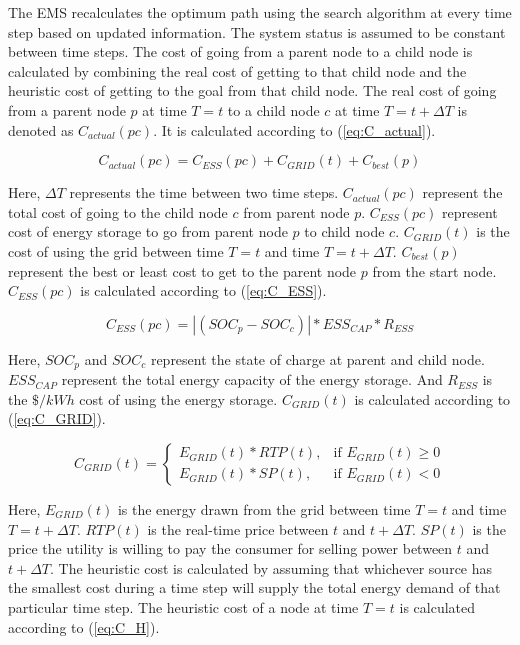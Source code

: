 The EMS recalculates the optimum path using the search algorithm at every time step based on updated information. The system status is assumed to be constant between time steps. The cost of going from a parent node to a child node is calculated by combining the real cost of getting to that child node and the heuristic cost of getting to the goal from that child node. The real cost of going from a parent node $p$ at time $T=t$ to a child node $c$ at time $T=t+\Delta T$ is denoted as $C_{actual}(pc)$. It is calculated according to (\ref{eq:C_actual}).

\begin{equation}
\label{eq:C_actual}
    C_{actual}(pc) =  C_{ESS}(pc)+C_{GRID}(t)+C_{best}(p)
\end{equation}

Here, $\Delta T$ represents the time between two time steps. $C_{actual}(pc)$ represent the total cost of going to the child node $c$ from parent node $p$. $C_{ESS}(pc)$ represent cost of energy storage to go from parent node $p$ to child node $c$. $C_{GRID}(t)$ is the cost of using the grid between time $T=t$ and time $T=t+\Delta T$. $C_{best}(p)$ represent the best or least cost to get to the parent node $p$ from the start node. $C_{ESS}(pc)$ is calculated according to (\ref{eq:C_ESS}).

\begin{equation}
\label{eq:C_ESS}
C_{ESS}(pc) = |(SOC_p - SOC_c)|*ESS_{CAP}*R_{ESS} 
\end{equation}

Here, $SOC_p$ and $SOC_c$ represent the state of charge at parent and child node. $ESS_{CAP}$ represent the total energy capacity of the energy storage. And $R_{ESS}$ is the $\$/kWh$ cost of using the energy storage. $C_{GRID}(t)$ is calculated according to (\ref{eq:C_GRID}).

\begin{equation}
\label{eq:C_GRID}
C_{GRID}(t) = 
\begin{cases}
   E_{GRID}(t)*RTP(t),& \text{if } E_{GRID}(t)\geq 0\\
    E_{GRID}(t)*SP(t),& \text{if }  E_{GRID}(t) < 0
\end{cases}
\end{equation}

Here, $E_{GRID}(t)$ is the energy drawn from the grid between time $T=t$ and time $T=t+\Delta T$. $RTP(t)$ is the real-time price between $t$ and $t+\Delta T$. $SP(t)$ is the price the utility is willing to pay the consumer for selling power between $t$ and $t+\Delta T$. The heuristic cost is calculated by assuming that whichever source has the smallest cost during a time step will supply the total energy demand of that particular time step. The heuristic cost of a node at time $T = t$ is calculated according to (\ref{eq:C_H}).


